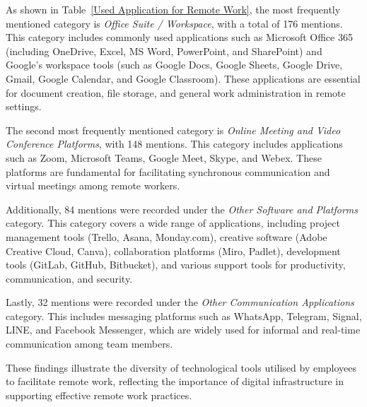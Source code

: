 \documentclass[a4paper, conference]{IEEEtran}
\begin{document}
As shown in Table~\ref{Used Application for Remote Work}, the most frequently mentioned category is \textit{Office Suite / Workspace}, with a total of 176 mentions. This category includes commonly used applications such as Microsoft Office 365 (including OneDrive, Excel, MS Word, PowerPoint, and SharePoint) and Google's workspace tools (such as Google Docs, Google Sheets, Google Drive, Gmail, Google Calendar, and Google Classroom). These applications are essential for document creation, file storage, and general work administration in remote settings.

The second most frequently mentioned category is \textit{Online Meeting and Video Conference Platforms}, with 148 mentions. This category includes applications such as Zoom, Microsoft Teams, Google Meet, Skype, and Webex. These platforms are fundamental for facilitating synchronous communication and virtual meetings among remote workers.

Additionally, 84 mentions were recorded under the \textit{Other Software and Platforms} category. This category covers a wide range of applications, including project management tools (Trello, Asana, Monday.com), creative software (Adobe Creative Cloud, Canva), collaboration platforms (Miro, Padlet), development tools (GitLab, GitHub, Bitbucket), and various support tools for productivity, communication, and security.

Lastly, 32 mentions were recorded under the \textit{Other Communication Applications} category. This includes messaging platforms such as WhatsApp, Telegram, Signal, LINE, and Facebook Messenger, which are widely used for informal and real-time communication among team members.

These findings illustrate the diversity of technological tools utilised by employees to facilitate remote work, reflecting the importance of digital infrastructure in supporting effective remote work practices.
\end{document}
